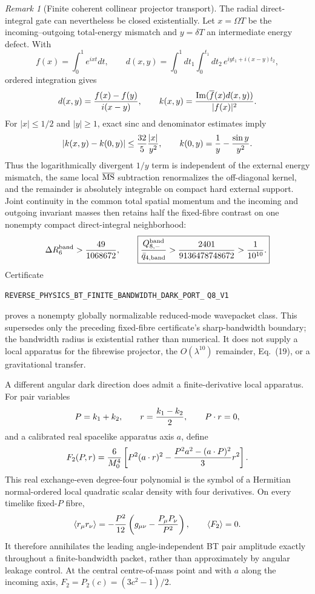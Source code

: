 \documentclass[11pt]{article}
\theoremstyle{definition}
\theoremstyle{remark}
\newtheorem{remark}[theorem]{Remark}
\begin{document}
\begin{remark}[Finite coherent collinear projector transport]
The radial direct-integral gate can nevertheless be closed existentially.
Let $x=\Omega T$ be the incoming--outgoing total-energy mismatch and
$y=\delta T$ an intermediate energy defect.  With
\[
 f(x)=\int_0^1e^{ixt}dt,\qquad
 d(x,y)=\int_0^1dt_1\int_0^{t_1}dt_2\,e^{iyt_1+i(x-y)t_2},
\]
ordered integration gives
\[
 d(x,y)={f(x)-f(y)\over i(x-y)},\qquad
 k(x,y)={\operatorname{Im}(\overline f(x)d(x,y))\over|f(x)|^2}.
\]
For $|x|\leq1/2$ and $|y|\geq1$, exact sinc and denominator estimates imply
\[
 |k(x,y)-k(0,y)|\leq {32\over5}{|x|\over y^2},\qquad
 k(0,y)={1\over y}-{\sin y\over y^2}.
\]
Thus the logarithmically divergent $1/y$ term is independent of the external
energy mismatch, the same local $\overline{\rm MS}$ subtraction renormalizes
the off-diagonal kernel, and the remainder is absolutely integrable on
compact hard external support.  Joint continuity in the common total spatial
momentum and the incoming and outgoing invariant masses then retains half the
fixed-fibre contrast on one nonempty compact direct-integral neighborhood:
\[
 \Delta R_6^{\rm band}>{49\over1068672},\qquad
 \boxed{{Q_{8,-}^{\rm band}\over\bar q_{4,\rm band}}
 >{2401\over9136478748672}>{1\over10^{10}}.}
\]
Certificate
\par\noindent
\texttt{REVERSE\_PHYSICS\_BT\_FINITE\_BANDWIDTH\_DARK\_PORT\_}
\allowbreak\texttt{Q8\_V1}
\par\noindent
proves a nonempty globally normalizable reduced-mode wavepacket class.  This
supersedes only the preceding fixed-fibre certificate's sharp-bandwidth
boundary; the bandwidth radius is existential rather than numerical.  It
does not supply a local apparatus for the fibrewise projector, the
$O(\lambda^{10})$ remainder, Eq.~(19), or a gravitational transfer.

A different angular dark direction does admit a finite-derivative local
apparatus.  For pair variables
\[
 P=k_1+k_2,\qquad r={k_1-k_2\over2},\qquad P\mathbin{\cdot}r=0,
\]
and a calibrated real spacelike apparatus axis $a$, define
\[
 F_2(P,r)={6\over M_0^4}\left[
 P^2(a\mathbin{\cdot}r)^2
 -{P^2a^2-(a\mathbin{\cdot}P)^2\over3}r^2\right].
\]
This real exchange-even degree-four polynomial is the symbol of a Hermitian
normal-ordered local quadratic scalar density with four derivatives.  On
every timelike fixed-$P$ fibre,
\[
 \langle r_\mu r_\nu\rangle
 =-{P^2\over12}\left(g_{\mu\nu}-{P_\mu P_\nu\over P^2}\right),
 \qquad \langle F_2\rangle=0.
\]
It therefore annihilates the leading angle-independent BT pair amplitude
exactly throughout a finite-bandwidth packet, rather than approximately by
angular leakage control.  At the central centre-of-mass point and with $a$
along the incoming axis, $F_2=P_2(c)=(3c^2-1)/2$.


\end{remark}
\end{document}
